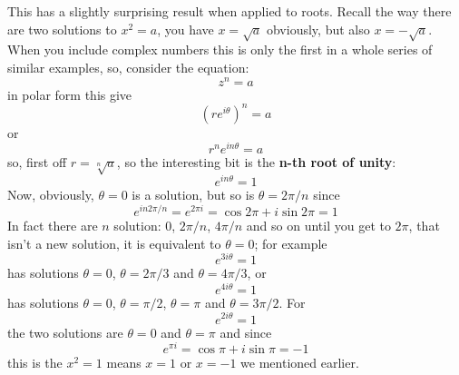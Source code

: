 \documentclass[12pt]{article}
\begin{document}
This has a slightly surprising result when applied to roots. Recall
the way there are two solutions to $x^2=a$, you have $x=\sqrt{a}$
obviously, but also $x=-\sqrt{a}$. When you include complex numbers
this is only the first in a whole series of similar examples, so, consider the equation:
\begin{equation}
  z^n=a
\end{equation}
in polar form this give
\begin{equation}
  \left(re^{i\theta}\right)^n=a
\end{equation}
or
\begin{equation}
  r^ne^{in\theta}=a
\end{equation}
so, first off $r=\sqrt[n]{a}$, so the interesting bit is the \textbf{n-th root of unity}:
\begin{equation}
  e^{in\theta}=1
\end{equation}
Now, obviously, $\theta=0$ is a solution, but so is $\theta=2\pi/n$ since 
\begin{equation}
  e^{in2\pi/n}=e^{2\pi i}=\cos{2\pi}+i\sin{2\pi}=1
\end{equation}
In fact there are $n$ solution: 0, $2\pi/n$, $4\pi/n$ and so on until you get to $2\pi$, that isn't a new solution, it is equivalent to $\theta=0$; for example
\begin{equation}
  e^{3i\theta}=1
\end{equation}
has solutions $\theta=0$, $\theta=2\pi/3$ and $\theta=4\pi/3$, or
\begin{equation}
  e^{4i\theta}=1
\end{equation}
has solutions $\theta=0$, $\theta=\pi/2$, $\theta=\pi$ and $\theta=3\pi/2$. For
\begin{equation}
  e^{2i\theta}=1
\end{equation}
the two solutions are $\theta=0$ and $\theta=\pi$ and since
\begin{equation}
  e^{\pi i}=\cos{\pi}+i\sin{\pi}=-1
\end{equation}
this is the $x^2=1$ means $x=1$ or $x=-1$ we mentioned earlier.
\end{document}
